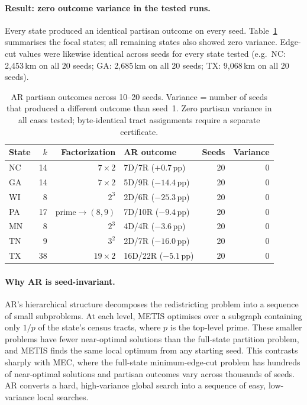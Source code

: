 \paragraph{Result: zero outcome variance in the tested runs.}
Every state produced an identical partisan outcome on every seed.
Table~\ref{tab:seed-sensitivity} summarises the focal states; all remaining
states also showed zero variance. Edge-cut values were likewise identical
across seeds for every state tested (e.g.\ NC: 2{,}453\,km on all 20 seeds;
GA: 2{,}685\,km on all 20 seeds; TX: 9{,}068\,km on all 20 seeds).

\begin{table}[h]
\centering\small
\begin{tabular}{lrrlrr}
\toprule
State & $k$ & Factorization & AR outcome & Seeds & Variance \\
\midrule
NC & 14 & $7 \times 2$ & 7D/7R ($+0.7$\,pp) & 20 & 0 \\
GA & 14 & $7 \times 2$ & 5D/9R ($-14.4$\,pp) & 20 & 0 \\
WI & 8  & $2^3$        & 2D/6R ($-25.3$\,pp) & 20 & 0 \\
PA & 17 & prime$\to(8{,}9)$ & 7D/10R ($-9.4$\,pp) & 20 & 0 \\
MN & 8  & $2^3$        & 4D/4R ($-3.6$\,pp)  & 20 & 0 \\
TN & 9  & $3^2$        & 2D/7R ($-16.0$\,pp) & 20 & 0 \\
TX & 38 & $19 \times 2$ & 16D/22R ($-5.1$\,pp) & 20 & 0 \\
\bottomrule
\end{tabular}
\caption{AR partisan outcomes across 10--20 seeds. Variance = number of seeds
  that produced a different outcome than seed~1. Zero partisan variance in all
  cases tested; byte-identical tract assignments require a separate certificate.}
\label{tab:seed-sensitivity}
\end{table}

\paragraph{Why AR is seed-invariant.}
AR's hierarchical structure decomposes the redistricting problem into a
sequence of small subproblems. At each level, METIS optimises over a
subgraph containing only $1/p$ of the state's census tracts, where $p$ is the
top-level prime. These smaller problems have fewer near-optimal solutions than
the full-state partition problem, and METIS finds the same local optimum from
any starting seed. This contrasts sharply with MEC, where the full-state
minimum-edge-cut problem has hundreds of near-optimal solutions and partisan
outcomes vary across thousands of seeds. AR converts a hard, high-variance
global search into a sequence of easy, low-variance local searches.

